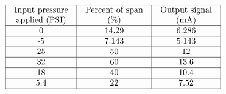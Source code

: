 

$$\vbox{\offinterlineskip
\halign{\strut
\vrule \quad\hfil # \ \hfil & 
\vrule \quad\hfil # \ \hfil & 
\vrule \quad\hfil # \ \hfil \vrule \cr
\noalign{\hrule}
%
Input pressure & Percent of span & Output signal \cr
%
applied (PSI) & (\%) & (mA) \cr
%
\noalign{\hrule}
%
0 & 14.29 & 6.286 \cr
%
\noalign{\hrule}
%
-5 & 7.143 & 5.143 \cr
%
\noalign{\hrule}
%
25 & 50 & 12 \cr
%
\noalign{\hrule}
%
32 & 60 & 13.6 \cr
%
\noalign{\hrule}
%
18 & 40 & 10.4 \cr
%
\noalign{\hrule}
%
5.4 & 22 & 7.52 \cr
%
\noalign{\hrule}
} %
}$$ %




